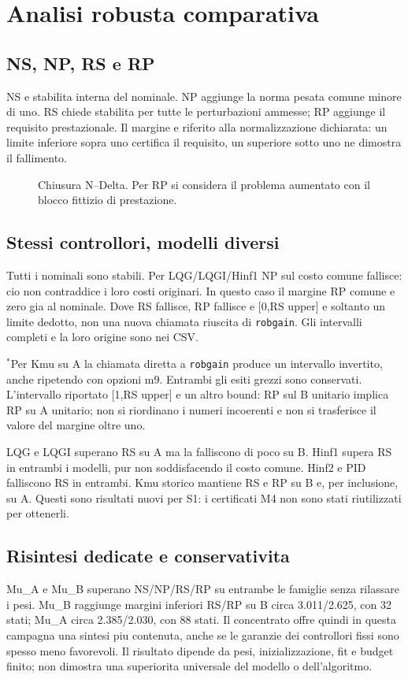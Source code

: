 \documentclass[11pt,a4paper,oneside]{report}
\newcommand{\schema}[2]{\begin{figure}[htbp]\centering\resizebox{.95\linewidth}{!}{}\caption{#2}\end{figure}}
\begin{document}
\chapter{Analisi robusta comparativa}
\section{NS, NP, RS e RP}
NS e stabilita interna del nominale. NP aggiunge la norma pesata comune
minore di uno. RS chiede stabilita per tutte le perturbazioni ammesse;
RP aggiunge il requisito prestazionale. Il margine e riferito alla
normalizzazione dichiarata: un limite inferiore sopra uno certifica il
requisito, un superiore sotto uno ne dimostra il fallimento.
\schema{robusta}{Chiusura N--Delta. Per RP si considera il problema aumentato con il blocco fittizio di prestazione.}
\section{Stessi controllori, modelli diversi}

Tutti i nominali sono stabili. Per LQG/LQGI/Hinf1 NP sul costo comune
fallisce: cio non contraddice i loro costi originari. In questo caso il
margine RP comune e zero gia al nominale. Dove RS fallisce, RP fallisce
e [0,RS upper] e soltanto un limite dedotto, non una nuova chiamata riuscita
di \texttt{robgain}. Gli intervalli completi e la loro origine sono nei CSV.

$^*$Per Kmu su A la chiamata diretta a \texttt{robgain} produce un
intervallo invertito, anche ripetendo con opzioni m9. Entrambi gli esiti
grezzi sono conservati. L'intervallo riportato [1,RS upper] e un altro
bound: RP sul B unitario implica RP su A unitario; non si riordinano i
numeri incoerenti e non si trasferisce il valore del margine oltre uno.

LQG e LQGI superano RS su A ma la falliscono di poco su B. Hinf1 supera
RS in entrambi i modelli, pur non soddisfacendo il costo comune. Hinf2 e
PID falliscono RS in entrambi. Kmu storico mantiene RS e RP su B e, per
inclusione, su A. Questi sono risultati nuovi per S1: i certificati M4
non sono stati riutilizzati per ottenerli.
\section{Risintesi dedicate e conservativita}
Mu\_A e Mu\_B superano NS/NP/RS/RP su entrambe le famiglie senza rilassare
i pesi. Mu\_B raggiunge margini inferiori RS/RP su B circa 3.011/2.625,
con 32 stati; Mu\_A circa 2.385/2.030, con 88 stati.
Il concentrato offre quindi in questa campagna una sintesi piu contenuta,
anche se le garanzie dei controllori fissi sono spesso meno favorevoli.
Il risultato dipende da pesi, inizializzazione, fit e budget finito;
non dimostra una superiorita universale del modello o dell'algoritmo.
\end{document}
